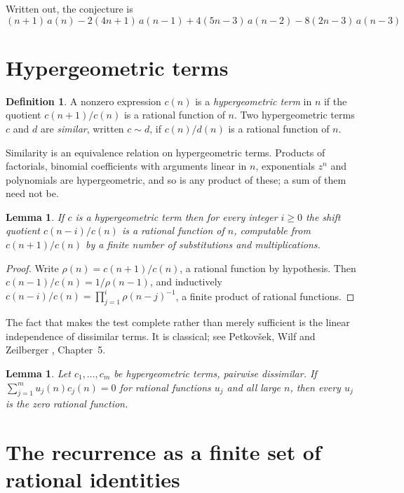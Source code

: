 \documentclass[11pt,a4paper]{article}
\theoremstyle{plain}
\newtheorem{lemma}[theorem]{Lemma}
\theoremstyle{definition}
\newtheorem{definition}[theorem]{Definition}
\begin{document}
Written out, the conjecture is
\begin{equation}\label{eq:conj}
(n + 1)\,a(n) -  2 \left(4 n + 1\right)\,a(n-1) + 4 \left(5 n - 3\right)\,a(n-2) -  8 \left(2 n - 3\right)\,a(n-3)
\end{equation}

\section{Hypergeometric terms}

\begin{definition}
A nonzero expression $c(n)$ is a \emph{hypergeometric term} in $n$ if the quotient
$c(n+1)/c(n)$ is a rational function of $n$. Two hypergeometric terms $c$ and $d$ are
\emph{similar}, written $c\sim d$, if $c(n)/d(n)$ is a rational function of $n$.
\end{definition}

Similarity is an equivalence relation on hypergeometric terms. Products of factorials,
binomial coefficients with arguments linear in $n$, exponentials $z^{n}$ and polynomials
are hypergeometric, and so is any product of these; a sum of them need not be.

\begin{lemma}\label{lem:shift}
If $c$ is a hypergeometric term then for every integer $i\ge 0$ the shift quotient
$c(n-i)/c(n)$ is a rational function of $n$, computable from $c(n+1)/c(n)$ by a finite
number of substitutions and multiplications.
\end{lemma}

\begin{proof}
Write $\rho(n)=c(n+1)/c(n)$, a rational function by hypothesis. Then
$c(n-1)/c(n)=1/\rho(n-1)$, and inductively
$c(n-i)/c(n)=\prod_{j=1}^{i}\rho(n-j)^{-1}$, a finite product of rational functions.
\end{proof}

The fact that makes the test complete rather than merely sufficient is the linear
independence of dissimilar terms. It is classical; see Petkov\v{s}ek, Wilf and Zeilberger
\cite{AB}, Chapter~5.

\begin{lemma}\label{lem:indep}
Let $c_{1},\dots,c_{m}$ be hypergeometric terms, pairwise dissimilar. If
$\sum_{j=1}^{m}u_{j}(n)c_{j}(n)=0$ for rational functions $u_{j}$ and all large $n$, then
every $u_{j}$ is the zero rational function.
\end{lemma}

\section{The recurrence as a finite set of rational identities}
\end{document}
